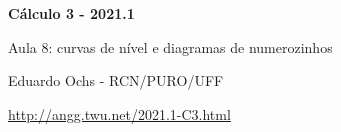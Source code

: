 \documentclass[oneside,12pt]{article}
\begin{document}


\long{}
\long{}
\long{}
\long{}
\long{}
\long{}
\long{}
\long{}
\long{}
\long{}
\long{}

\long{}
\long{}

\def\frown{\ensuremath{{=}{(}}}
\def\True {\mathbf{V}}
\def\False{\mathbf{F}}
\def\D    {\displaystyle}

\def\drafturl{http://angg.twu.net/LATEX/2021-1-C3.pdf}
\def\drafturl{http://angg.twu.net/2021.1-C3.html}
\def\draftfooter{\tiny \href{\drafturl}{\jobname{}} \ColorBrown{\shorttoday{} \hours}}



%

\thispagestyle{empty}

\begin{center}

\vspace*{1.2cm}

{\bf \Large Cálculo 3 - 2021.1}

\bsk

Aula 8: curvas de nível e diagramas de numerozinhos

\bsk

Eduardo Ochs - RCN/PURO/UFF

\url{http://angg.twu.net/2021.1-C3.html}

\end{center}
\end{document}
